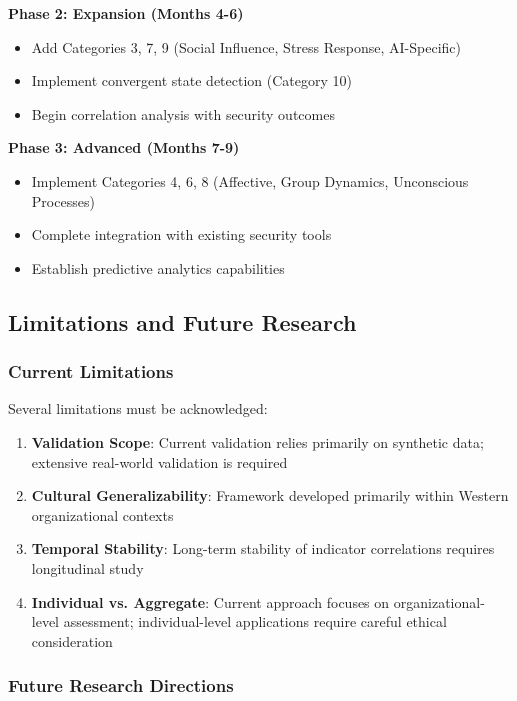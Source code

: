 \documentclass[11pt, onecolumn]{article}
\begin{document}
\textbf{Phase 2: Expansion (Months 4-6)}
\begin{itemize}
\item Add Categories 3, 7, 9 (Social Influence, Stress Response, AI-Specific)
\item Implement convergent state detection (Category 10)
\item Begin correlation analysis with security outcomes
\end{itemize}

\textbf{Phase 3: Advanced (Months 7-9)}
\begin{itemize}
\item Implement Categories 4, 6, 8 (Affective, Group Dynamics, Unconscious Processes)
\item Complete integration with existing security tools
\item Establish predictive analytics capabilities
\end{itemize}

\subsection{Limitations and Future Research}

\subsubsection{Current Limitations}

Several limitations must be acknowledged:

\begin{enumerate}
\item \textbf{Validation Scope}: Current validation relies primarily on synthetic data; extensive real-world validation is required
\item \textbf{Cultural Generalizability}: Framework developed primarily within Western organizational contexts
\item \textbf{Temporal Stability}: Long-term stability of indicator correlations requires longitudinal study
\item \textbf{Individual vs. Aggregate}: Current approach focuses on organizational-level assessment; individual-level applications require careful ethical consideration
\end{enumerate}

\subsubsection{Future Research Directions}
\end{document}
